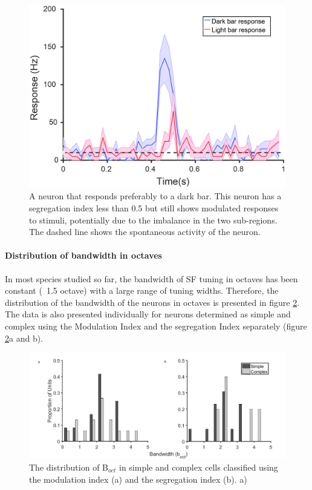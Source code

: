 		\begin{figure}[]
		
		\includegraphics[width=\linewidth]{LinearV1/concneurons.jpg}
		\caption{A neuron that responds preferably to a dark bar. This neuron has a segregation index less than 0.5 but still shows modulated responses to stimuli, potentially due to the imbalance in the two sub-regions. The dashed line shows the spontaneous activity of the neuron.}
		\label{fig:conc}
	\end{figure}

	\paragraph{Distribution of bandwidth in octaves}
	
	In most species studied so far, the bandwidth of SF tuning in octaves has been constant (~1.5 octave) with a large range of tuning widths. Therefore, the distribution of the bandwidth of the neurons in octaves is presented in figure \ref{fig:boct}. The data is also presented individually for neurons determined as simple and complex using the Modulation Index and the segregation Index separately (figure \ref{fig:boct}a and b).

		\begin{figure}[H]
		
		\includegraphics[width=\linewidth]{LinearV1/boct.jpg}
		\caption{The distribution of B$_{oct}$ in simple and complex cells classified using the modulation index (a) and the segregation index (b). a) }
		\label{fig:boct}
		
		\end{figure}
	
